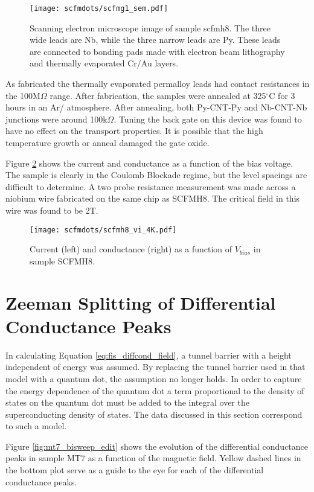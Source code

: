 \begin{figure}
    \centering
    \texttt{[image: scfmdots/scfmg1\_sem.pdf]}
    \caption{Scanning electron microscope image of sample scfmh8. The three wide leads are Nb, while the three narrow leads are Py. These leads are connected to bonding pads made with electron beam lithography and thermally evaporated Cr/Au layers.}
    \label{fig:scfmh8}
\end{figure}

As fabricated the thermally evaporated permalloy leads had contact resistances in the 100M$\Omega$ range. After fabrication, the samples were annealed at 325$^\circ$C for 3 hours in an Ar/ atmosphere. After annealing, both Py-CNT-Py and Nb-CNT-Nb junctions were around 100k$\Omega$. Tuning the back gate on this device was found to have no effect on the transport properties. It is possible that the high temperature growth or anneal damaged the gate oxide.

Figure \ref{fig:scfmh8_vi} shows the current and conductance as a function of the bias voltage. The sample is clearly in the Coulomb Blockade regime, but the level spacings are difficult to determine. A two probe resistance measurement was made across a niobium wire fabricated on the same chip as SCFMH8. The critical field in this wire was found to be 2T.

\begin{figure}
    \centering
    \texttt{[image: scfmdots/scfmh8\_vi\_4K.pdf]}
    \caption{Current (left) and conductance (right) as a function of $V_{bias}$ in sample SCFMH8.}
    \label{fig:scfmh8_vi}
\end{figure}

\section{Zeeman Splitting of Differential Conductance Peaks}

In calculating Equation \ref{eq:fis_diffcond_field}, a tunnel barrier with a height independent of energy was assumed. By replacing the tunnel barrier used in that model with a quantum dot, the assumption no longer holds. In order to capture the energy dependence of the quantum dot a term proportional to the density of states on the quantum dot must be added to the integral over the superconducting density of states. The data discussed in this section correspond to such a model.

Figure \ref{fig:mt7_bisweep_edit} shows the evolution of the differential conductance peaks in sample MT7 as a function of the magnetic field. Yellow dashed lines in the bottom plot serve as a guide to the eye for each of the differential conductance peaks.

